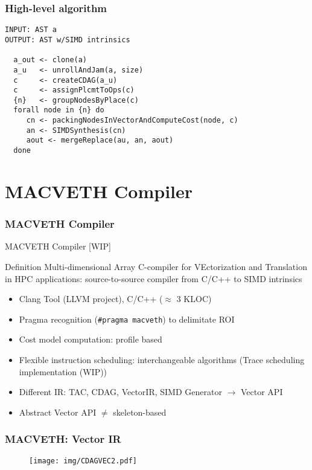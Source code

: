 \documentclass[xcolor=table,hideothersubsections,aspectratio=1610]{beamer}
\begin{document}
\begin{frame}[fragile]
\frametitle{High-level algorithm}
\begin{verbatim}
INPUT: AST a
OUTPUT: AST w/SIMD intrinsics

  a_out <- clone(a)
  a_u   <- unrollAndJam(a, size)
  c     <- createCDAG(a_u)
  c     <- assignPlcmtToOps(c)
  {n}   <- groupNodesByPlace(c)
  forall node in {n} do
     cn <- packingNodesInVectorAndComputeCost(node, c)
     an <- SIMDSynthesis(cn)
     aout <- mergeReplace(au, an, aout)
  done
\end{verbatim}
    
\end{frame}







\section{MACVETH Compiler}
\frametitle{MACVETH Compiler}
\begin{frame}{MACVETH Compiler [WIP]}
\begin{block}{Definition}
Multi-dimensional Array C-compiler for VEctorization and Translation in HPC applications: source-to-source compiler from C/C++ to SIMD intrinsics
\end{block}
\begin{itemize}
    \item Clang Tool (LLVM project), C/C++ ($\approx$ 3 KLOC)
    \item Pragma recognition (\texttt{\#pragma macveth}) to delimitate ROI
    \item Cost model computation: profile based
    \item Flexible instruction scheduling: interchangeable algorithms (Trace scheduling implementation (WIP))
    \item Different IR: TAC, CDAG, VectorIR, SIMD Generator $\rightarrow$ Vector API
    \item Abstract Vector API $\neq$ skeleton-based
\end{itemize}

\end{frame}

\begin{frame}[fragile]
\frametitle{MACVETH: Vector IR}
\begin{figure}
    \centering
    \texttt{[image: img/CDAGVEC2.pdf]}
\end{figure}
\end{frame}
\end{document}
